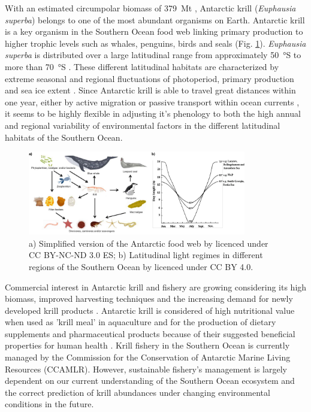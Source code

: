 With an estimated circumpolar biomass of \SI{379}{\mega\tonne} \citep{atkinson_life_1998},
Antarctic krill (\textit{Euphausia superba}) belongs to one of the
most abundant organisms on Earth. Antarctic krill is a key organism in the
Southern Ocean food web linking primary production to higher trophic levels
such as whales, penguins, birds and seals (Fig. \ref{figure1}). \textit{Euphausia superba}
is distributed over a large latitudinal range from approximately \SI{50}{\degree}S
to more than \SI{70}{\degree}S \citep{hill_potential_2013}. These different latitudinal
habitats are characterized by extreme seasonal and regional fluctuations of
photoperiod, primary production and sea ice extent \citep{quetin_behavioral_1991}.
Since Antarctic krill is able to travel great distances within one year, either
by active migration \citep{siegel_concept_1988} or passive transport within ocean currents \citep{thorpe_circumpolar_2007}, it seems to be highly flexible in adjusting it's
phenology to both the high annual and regional variability of environmental
factors in the different latitudinal habitats of the Southern Ocean.

\begin{figure}
        \centering
        \includegraphics[width=0.85\textwidth]{../Figures/Figure1.pdf}
        \caption{a) Simplified version of the Antarctic food web by
        \citet{balana_biodiversity_2013} licenced under CC BY-NC-ND 3.0 ES; b)
        Latitudinal light regimes in different regions of the Southern Ocean by
        \citet{meyer_performance_2012} licenced under CC BY 4.0.}
        \label{figure1}
\end{figure}

Commercial interest in Antarctic krill and fishery are growing considering its
high biomass, improved harvesting techniques and the increasing demand for
newly developed krill products \citep{nicol_fishery_2012}. Antarctic krill is
considered of high nutritional value when used as 'krill meal' in aquaculture \citep{yoshitomi_effect_2007} and for the production of dietary supplements and
pharmaceutical products because of their suggested beneficial properties for
human health \citep{tou_krill_2008}. Krill fishery in the Southern Ocean is
currently managed by the Commission for the Conservation of Antarctic Marine
Living Resources (CCAMLR). However, sustainable fishery's management is largely
dependent on our current understanding of the Southern Ocean ecosystem and the
correct prediction of krill abundances under changing environmental conditions
in the future.

